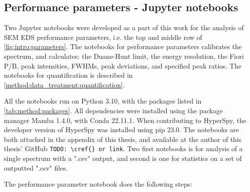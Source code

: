 \subsection{Performance parameters - Jupyter notebooks}
\label{method:data_treatment:notebook}

Two Jupyter notebooks were developed as a part of this work for the analysis of SEM EDS performance parameters, i.e. the top and middle row of \cref{fig:intro:parameters}.
The notebooks for performance parameters calibrates the spectrum, and calculates: the Duane-Hunt limit, the energy resolution, the Fiori P/B, peak intensities, FWHMs, peak deviations, and specified peak ratios.
The notebooks for quantification is described in \cref{method:data_treatment:quantification}.


All the notebooks run on Python 3.10, with the packages listed in \cref{tab:method:packages}.
All dependencies were installed using the package manager Mamba 1.4.0, with Conda 22.11.1.
When contributing to HyperSpy, the developer version of HyperSpy was installed using pip 23.0.
The notebooks are both attached in the appendix of this thesis, and available at the author of this thesis' GitHub \verb|TODO: \cref{} or link|.
Two first notebooks is for analysis of a single spectrum with a ".csv" output, and second is one for statistics on a set of outputted ".csv" files.






The performance parameter notebook does the following steps:

